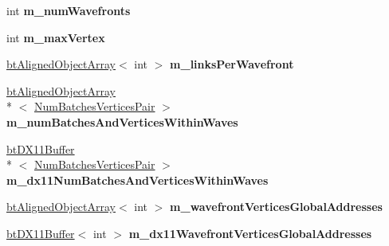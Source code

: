 \begin{DoxyCompactItemize}
\item 
\hypertarget{classbt_soft_body_link_data_d_x11_s_i_m_d_aware_a79f58e9d5d262b18db0da9f70431d973}{int {\bfseries m\+\_\+num\+Wavefronts}}\label{classbt_soft_body_link_data_d_x11_s_i_m_d_aware_a79f58e9d5d262b18db0da9f70431d973}

\item 
\hypertarget{classbt_soft_body_link_data_d_x11_s_i_m_d_aware_a3b0c58240b8ec7739681ba8fed871a42}{int {\bfseries m\+\_\+max\+Vertex}}\label{classbt_soft_body_link_data_d_x11_s_i_m_d_aware_a3b0c58240b8ec7739681ba8fed871a42}

\item 
\hypertarget{classbt_soft_body_link_data_d_x11_s_i_m_d_aware_a7b34cd1cb52238094786bd633f84a313}{\hyperlink{classbt_aligned_object_array}{bt\+Aligned\+Object\+Array}$<$ int $>$ {\bfseries m\+\_\+links\+Per\+Wavefront}}\label{classbt_soft_body_link_data_d_x11_s_i_m_d_aware_a7b34cd1cb52238094786bd633f84a313}

\item 
\hypertarget{classbt_soft_body_link_data_d_x11_s_i_m_d_aware_a912bb9cce8a58e53f5ea8a29fdc4e2a5}{\hyperlink{classbt_aligned_object_array}{bt\+Aligned\+Object\+Array}\\*
$<$ \hyperlink{structbt_soft_body_link_data_d_x11_s_i_m_d_aware_1_1_num_batches_vertices_pair}{Num\+Batches\+Vertices\+Pair} $>$ {\bfseries m\+\_\+num\+Batches\+And\+Vertices\+Within\+Waves}}\label{classbt_soft_body_link_data_d_x11_s_i_m_d_aware_a912bb9cce8a58e53f5ea8a29fdc4e2a5}

\item 
\hypertarget{classbt_soft_body_link_data_d_x11_s_i_m_d_aware_a0f7876fc5f548ba47ef75cb99efee311}{\hyperlink{classbt_d_x11_buffer}{bt\+D\+X11\+Buffer}\\*
$<$ \hyperlink{structbt_soft_body_link_data_d_x11_s_i_m_d_aware_1_1_num_batches_vertices_pair}{Num\+Batches\+Vertices\+Pair} $>$ {\bfseries m\+\_\+dx11\+Num\+Batches\+And\+Vertices\+Within\+Waves}}\label{classbt_soft_body_link_data_d_x11_s_i_m_d_aware_a0f7876fc5f548ba47ef75cb99efee311}

\item 
\hypertarget{classbt_soft_body_link_data_d_x11_s_i_m_d_aware_a531c47133965f2052e19fde16e4522ac}{\hyperlink{classbt_aligned_object_array}{bt\+Aligned\+Object\+Array}$<$ int $>$ {\bfseries m\+\_\+wavefront\+Vertices\+Global\+Addresses}}\label{classbt_soft_body_link_data_d_x11_s_i_m_d_aware_a531c47133965f2052e19fde16e4522ac}

\item 
\hypertarget{classbt_soft_body_link_data_d_x11_s_i_m_d_aware_adbf189fd5d94c2fb6172b382064dc571}{\hyperlink{classbt_d_x11_buffer}{bt\+D\+X11\+Buffer}$<$ int $>$ {\bfseries m\+\_\+dx11\+Wavefront\+Vertices\+Global\+Addresses}}\label{classbt_soft_body_link_data_d_x11_s_i_m_d_aware_adbf189fd5d94c2fb6172b382064dc571}


\end{DoxyCompactItemize}
